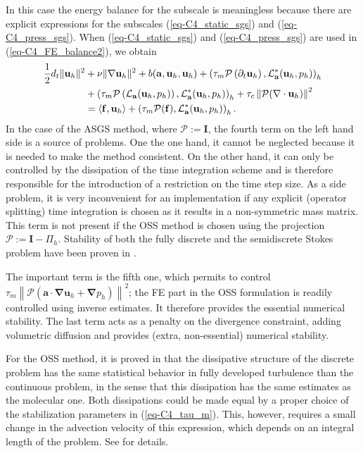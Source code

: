 In this case the energy balance for the subscale is meaningless because there are explicit expressions for the subscales (\ref{eq-C4_static_sgs}) and (\ref{eq-C4_press_sgs}). When (\ref{eq-C4_static_sgs}) and (\ref{eq-C4_press_sgs}) are used in (\ref{eq-C4_FE_balance2}), we obtain
\begin{align}
\label{eq-C4_static_energy}
\frac{1}{2}d_t\|{\bf u}_h\|^2
& +\nu\|\nabla{\bf u}_h\|^2 + b({\bf a},{\bf u}_h,{\bf u}_h)  
  + \left( \tau_{m} \mathcal{P} \left(  \partial_t {\bf u}_h \right), \mathcal{L}^*_{{\bf a}} ( {\bf u}_{h},p_h)\right)_h \\ \nonumber
& + \left(\tau_{m} \mathcal{P} \left( \mathcal{L}_{{\bf a}} ( {\bf u}_{h},p_h) \right),\mathcal{L}^*_{{\bf a}}({\bf u}_h,p_h)\right)_h
+ \tau_{c} \left\| \mathcal{P}(\nabla \cdot {\bf u}_{h})\right\|^{2}\\ \nonumber
& = \langle\mathbf{f},\mathbf{u}_h\rangle + \left(\tau_m \mathcal{P}(\mathbf{f}),\mathcal{L}^*_{{\bf a}}({\bf u}_h,p_h)\right)_h.
\end{align}
In the case of the ASGS method, where $\mathcal{P}:=\mathbf{I}$, the fourth term on the left hand side is a source of problems. One the one hand, it cannot be neglected because it is needed to make the method consistent. On the other hand, it can only be controlled by the dissipation of the time integration scheme and is therefore responsible for the introduction of a restriction on the time step size. As a side problem, it is very inconvenient for an implementation if any explicit (operator splitting) time integration is chosen as it results in a non-symmetric mass matrix. This term is not present if the OSS method is chosen using the projection $\mathcal{P}:=\mathbf{I}-\Pi_h$. Stability of both the fully discrete and the semidiscrete Stokes problem have been proven in \cite{Badia2009a}.

The important term is the fifth one, which permits to control
$ \tau_{m} \left\| \mathcal{P} \left( \mathbf{a}\cdot \mathbf{\nabla u}_{h}+\mathbf{\nabla }p_{h}\right) \right\|^{2} $; the FE part in the OSS formulation is readily controlled using inverse estimates. It therefore provides the essential numerical stability. The last term acts as a penalty on the divergence constraint, adding volumetric diffusion and provides (extra, non-essential) numerical stability.

For the OSS method, it is proved in \cite{guasch-codina-13} that the dissipative structure of the discrete problem has the same statistical behavior in fully developed turbulence than the continuous problem, in the sense that this dissipation has the same estimates as the molecular one. Both dissipations could be made equal by a proper choice of the stabilization parameters in (\ref{eq-C4_tau_m}). This, however, requires a small change in the advection velocity of this expression, which depends on an integral length of the problem. See \cite{guasch-codina-13} for details.

